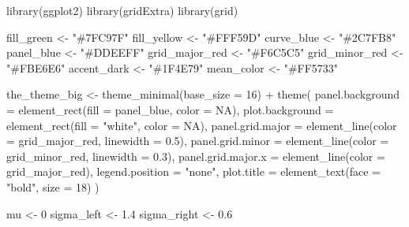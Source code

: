 \documentclass[
  letterpaper,
  DIV=11,
  numbers=noendperiod]{scrreprt}
\newenvironment{Shaded}{\begin{snugshade}}{\end{snugshade}}
\newcommand{\AttributeTok}[1]{\textcolor[rgb]{0.40,0.45,0.13}{#1}}
\newcommand{\ConstantTok}[1]{\textcolor[rgb]{0.56,0.35,0.01}{#1}}
\newcommand{\DecValTok}[1]{\textcolor[rgb]{0.68,0.00,0.00}{#1}}
\newcommand{\FloatTok}[1]{\textcolor[rgb]{0.68,0.00,0.00}{#1}}
\newcommand{\FunctionTok}[1]{\textcolor[rgb]{0.28,0.35,0.67}{#1}}
\newcommand{\NormalTok}[1]{\textcolor[rgb]{0.00,0.23,0.31}{#1}}
\newcommand{\OtherTok}[1]{\textcolor[rgb]{0.00,0.23,0.31}{#1}}
\newcommand{\SpecialCharTok}[1]{\textcolor[rgb]{0.37,0.37,0.37}{#1}}
\newcommand{\StringTok}[1]{\textcolor[rgb]{0.13,0.47,0.30}{#1}}
\begin{document}
\begin{Shaded}
\begin{Highlighting}[]
\FunctionTok{library}\NormalTok{(ggplot2)}
\FunctionTok{library}\NormalTok{(gridExtra)}
\FunctionTok{library}\NormalTok{(grid)}

\NormalTok{fill\_green }\OtherTok{\textless{}{-}} \StringTok{"\#7FC97F"}
\NormalTok{fill\_yellow }\OtherTok{\textless{}{-}} \StringTok{"\#FFF59D"}
\NormalTok{curve\_blue }\OtherTok{\textless{}{-}} \StringTok{"\#2C7FB8"}
\NormalTok{panel\_blue }\OtherTok{\textless{}{-}} \StringTok{"\#DDEEFF"}
\NormalTok{grid\_major\_red }\OtherTok{\textless{}{-}} \StringTok{"\#F6C5C5"}
\NormalTok{grid\_minor\_red }\OtherTok{\textless{}{-}} \StringTok{"\#FBE6E6"}
\NormalTok{accent\_dark  }\OtherTok{\textless{}{-}} \StringTok{"\#1F4E79"}
\NormalTok{mean\_color   }\OtherTok{\textless{}{-}} \StringTok{"\#FF5733"}

\NormalTok{the\_theme\_big }\OtherTok{\textless{}{-}} \FunctionTok{theme\_minimal}\NormalTok{(}\AttributeTok{base\_size =} \DecValTok{16}\NormalTok{) }\SpecialCharTok{+}
  \FunctionTok{theme}\NormalTok{(}
    \AttributeTok{panel.background =} \FunctionTok{element\_rect}\NormalTok{(}\AttributeTok{fill =}\NormalTok{ panel\_blue, }\AttributeTok{color =} \ConstantTok{NA}\NormalTok{),}
    \AttributeTok{plot.background  =} \FunctionTok{element\_rect}\NormalTok{(}\AttributeTok{fill =} \StringTok{"white"}\NormalTok{, }\AttributeTok{color =} \ConstantTok{NA}\NormalTok{),}
    \AttributeTok{panel.grid.major =} \FunctionTok{element\_line}\NormalTok{(}\AttributeTok{color =}\NormalTok{ grid\_major\_red, }\AttributeTok{linewidth =} \FloatTok{0.5}\NormalTok{),}
    \AttributeTok{panel.grid.minor =} \FunctionTok{element\_line}\NormalTok{(}\AttributeTok{color =}\NormalTok{ grid\_minor\_red, }\AttributeTok{linewidth =} \FloatTok{0.3}\NormalTok{),}
    \AttributeTok{panel.grid.major.x =} \FunctionTok{element\_line}\NormalTok{(}\AttributeTok{color =}\NormalTok{ grid\_major\_red),}
    \AttributeTok{legend.position =} \StringTok{"none"}\NormalTok{,}
    \AttributeTok{plot.title =} \FunctionTok{element\_text}\NormalTok{(}\AttributeTok{face =} \StringTok{"bold"}\NormalTok{, }\AttributeTok{size =} \DecValTok{18}\NormalTok{)}
\NormalTok{  )}

\NormalTok{mu }\OtherTok{\textless{}{-}} \DecValTok{0}
\NormalTok{sigma\_left  }\OtherTok{\textless{}{-}} \FloatTok{1.4}
\NormalTok{sigma\_right }\OtherTok{\textless{}{-}} \FloatTok{0.6}


\end{Highlighting}
\end{Shaded}
\end{document}
